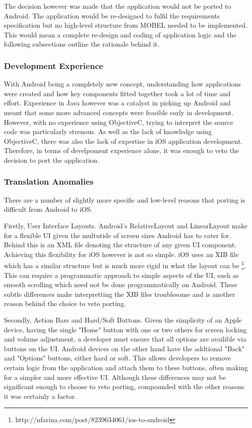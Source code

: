 \documentclass{l4proj}
\begin{document}
The decision however was made that the application would not be ported to Android.  The application would be re-designed to fulfil the requirements specification but no high-level structure from MOBEL needed to be implemented.  This would mean a complete re-design and coding of application logic and the following subsections outline the rationale behind it. 

\subsubsection{Development Experience}
With Android being a completely new concept, understanding how applications were created and how key components fitted together took  a lot of time and effort. Experience in Java however was a catalyst in picking up Android and meant that some more advanced concepts were feasible early in development.  However, with no experience using ObjectiveC, trying to interpret the source code was particularly strenous. As well as the lack of knowledge using ObjectiveC, there was also the lack of expertise in iOS application development. Therefore, in terms of develpoment experience alone, it was enough to veto the decision to port the application.

\subsubsection{Translation Anomalies}
There are a number of slightly more specific and low-level reasons that porting is difficult from Android to iOS.

Firstly, User Interface Layouts. Android's RelativeLayout and LinearLayout make for a flexible UI given the multutide of screen sizes Android has to cater for.  Behind this is an XML file denoting the structure of any given UI component.  Achieving this flexibility for iOS however is not so simple.  iOS uses an XIB file which has a similar structure but is much more rigid in what the layout can be  \footnote{http://nfarina.com/post/8239634061/ios-to-android}.  This can require a programmatic approach to simple aspects of the UI, such as smooth scrolling which need not be done programmatically on Android.  These subtle differences make interpretting the XIB files troublesome and is another reason behind the choice to veto porting.    

Secondly, Action Bars and Hard/Soft Buttons. Given the simplicity of an Apple device, having the single "Home" button with one or two others for screen locking and volume adjustment, a developer must ensure that all options are availible via buttons on the UI.  Android devices on the other hand have the addtional "Back" and "Options" buttons, either hard or soft.  This allows developers to remove certain logic from the application and attach them to these buttons, often making for a simpler and more effective UI.  Although these differences may not be significant enough to choose to veto porting, compounded with the other reasons it was certainly a factor.
\end{document}
